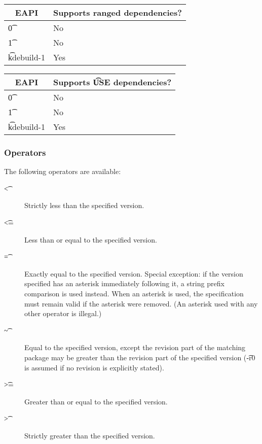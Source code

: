 \IFKDEBUILDELSE
{
    \begin{table}
    \centering
     \label{range-deps-table}
    \begin{tabular}{ l l }
        \toprule
        \multicolumn{1}{c}{\textbf{EAPI}} &
        \multicolumn{1}{c}{\textbf{Supports ranged dependencies?}} \\
        \midrule
    \t{0} & No \\
    \t{1} & No \\
    \t{kdebuild-1} & Yes \\
    \bottomrule
    \end{tabular}
    \end{table}

    \begin{table}
    \centering
     \label{use-deps-table}
    \begin{tabular}{ l l }
        \toprule
        \multicolumn{1}{c}{\textbf{EAPI}} &
        \multicolumn{1}{c}{\textbf{Supports \t{USE} dependencies?}} \\
        \midrule
    \t{0} & No \\
    \t{1} & No \\
    \t{kdebuild-1} & Yes \\
    \bottomrule
    \end{tabular}
    \end{table}
}{
}

\subsubsection{Operators}
\label{dep-operator}

The following operators are available:

\begin{description}
\item[\t{<}] Strictly less than the specified version.
\item[\t{<=}] Less than or equal to the specified version.
\item[\t{=}] Exactly equal to the specified version. Special exception: if the version
    specified has an asterisk immediately following it, a string prefix comparison is
    used instead. When an asterisk is used, the specification must remain valid if the
    asterisk were removed. (An asterisk used with any other operator is illegal.)
\item[\t{\~}] Equal to the specified version, except the revision part of the matching
    package may be greater than the revision part of the specified version (\t{-r0} is
    assumed if no revision is explicitly stated).
\item[\t{>=}] Greater than or equal to the specified version.
\item[\t{>}] Strictly greater than the specified version.
\end{description}

